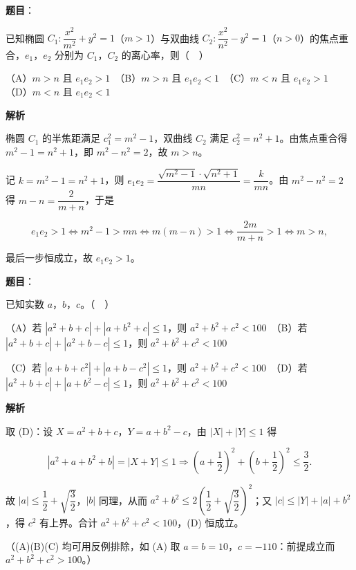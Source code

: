 \begin{answer}

\textbf{题目}：

已知椭圆 \(C_{1}:\dfrac{x^{2}}{m^{2}}+y^{2}=1\)（\(m>1\)）与双曲线 \(C_{2}:\dfrac{x^{2}}{n^{2}}-y^{2}=1\)（\(n>0\)）的焦点重合，\(e_{1}\)，\(e_{2}\) 分别为 \(C_{1}\)，\(C_{2}\) 的离心率，则（　）

（A）\(m>n\) 且 \(e_{1}e_{2}>1\)　（B）\(m>n\) 且 \(e_{1}e_{2}<1\)　（C）\(m<n\) 且 \(e_{1}e_{2}>1\)　（D）\(m<n\) 且 \(e_{1}e_{2}<1\)

\textbf{解析}

椭圆 \(C_{1}\) 的半焦距满足 \(c_{1}^{2}=m^{2}-1\)，双曲线 \(C_{2}\) 满足 \(c_{2}^{2}=n^{2}+1\)。由焦点重合得 \(m^{2}-1=n^{2}+1\)，即 \(m^{2}-n^{2}=2\)，故 \(m>n\)。

记 \(k=m^{2}-1=n^{2}+1\)，则 \(e_{1}e_{2}=\dfrac{\sqrt{m^{2}-1}\cdot\sqrt{n^{2}+1}}{mn}=\dfrac{k}{mn}\)。由 \(m^{2}-n^{2}=2\) 得 \(m-n=\dfrac{2}{m+n}\)，于是

\nopagebreak[4]
\[
e_{1}e_{2}>1\iff m^{2}-1>mn\iff m(m-n)>1\iff\dfrac{2m}{m+n}>1\iff m>n,
\]

最后一步恒成立，故 \(e_{1}e_{2}>1\)。


\end{answer}
\begin{answer}

\textbf{题目}：

已知实数 \(a\)，\(b\)，\(c\)。（　）

（A）若 \(|a^{2}+b+c|+|a+b^{2}+c|\leqslant 1\)，则 \(a^{2}+b^{2}+c^{2}<100\)　（B）若 \(|a^{2}+b+c|+|a^{2}+b-c|\leqslant 1\)，则 \(a^{2}+b^{2}+c^{2}<100\)

（C）若 \(|a+b+c^{2}|+|a+b-c^{2}|\leqslant 1\)，则 \(a^{2}+b^{2}+c^{2}<100\)　（D）若 \(|a^{2}+b+c|+|a+b^{2}-c|\leqslant 1\)，则 \(a^{2}+b^{2}+c^{2}<100\)

\textbf{解析}

取 (D)：设 \(X=a^{2}+b+c\)，\(Y=a+b^{2}-c\)，由 \(|X|+|Y|\leqslant 1\) 得

\nopagebreak[4]
\[
|a^{2}+a+b^{2}+b|=|X+Y|\leqslant 1\Longrightarrow\left(a+\dfrac{1}{2}\right)^{2}+\left(b+\dfrac{1}{2}\right)^{2}\leqslant\dfrac{3}{2}.
\]

故 \(|a|\leqslant\dfrac{1}{2}+\sqrt{\dfrac{3}{2}}\)，\(|b|\) 同理，从而 \(a^{2}+b^{2}\leqslant 2\left(\dfrac{1}{2}+\sqrt{\dfrac{3}{2}}\right)^{2}\)；又 \(|c|\leqslant|Y|+|a|+b^{2}\)，得 \(c^{2}\) 有上界。合计 \(a^{2}+b^{2}+c^{2}<100\)，(D) 恒成立。

（(A)(B)(C) 均可用反例排除，如 (A) 取 \(a=b=10\)，\(c=-110\)：前提成立而 \(a^{2}+b^{2}+c^{2}>100\)。）


\end{answer}
